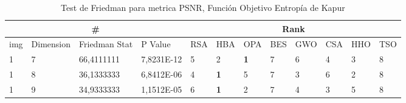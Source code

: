 \documentclass[conference]{IEEEtran}
\begin{document}
\begin{table}[]
	\centering
	\caption{Test de Friedman para metrica PSNR, Función Objetivo Entropía de Kapur}
	\begin{tabular}{|llll|llllllll|}
		\hline
		\multicolumn{4}{|c|}{\#} & \multicolumn{8}{c|}{Rank} \\ \hline
		\multicolumn{1}{|l|}{img} & \multicolumn{1}{l|}{Dimension} & \multicolumn{1}{l|}{Friedman Stat} & P Value & \multicolumn{1}{l|}{RSA} & \multicolumn{1}{l|}{HBA} & \multicolumn{1}{l|}{OPA} & \multicolumn{1}{l|}{BES} & \multicolumn{1}{l|}{GWO} & \multicolumn{1}{l|}{CSA} & \multicolumn{1}{l|}{HHO} & TSO \\ \hline 
\multicolumn{1}{|l|}{1}                                                     & \multicolumn{1}{l|}{7}                                                        & \multicolumn{1}{l|}{66,4111111}                                                   & 7,8231E-12                     & \multicolumn{1}{l|}{5}                                                  & \multicolumn{1}{l|}{2}                                                  & \multicolumn{1}{l|}{\textbf{1}}                                         & \multicolumn{1}{l|}{7}                                                  & \multicolumn{1}{l|}{6}                                                  & \multicolumn{1}{l|}{4}                                                  & \multicolumn{1}{l|}{3}                                                  & 8                          \\ \hline
\multicolumn{1}{|l|}{1}                                                     & \multicolumn{1}{l|}{8}                                                        & \multicolumn{1}{l|}{36,1333333}                                                   & 6,8412E-06                     & \multicolumn{1}{l|}{4}                                                  & \multicolumn{1}{l|}{\textbf{1}}                                         & \multicolumn{1}{l|}{5}                                                  & \multicolumn{1}{l|}{7}                                                  & \multicolumn{1}{l|}{3}                                                  & \multicolumn{1}{l|}{6}                                                  & \multicolumn{1}{l|}{2}                                                  & 8                          \\ \hline
\multicolumn{1}{|l|}{1}                                                     & \multicolumn{1}{l|}{9}                                                        & \multicolumn{1}{l|}{34,9333333}                                                   & 1,1512E-05                     & \multicolumn{1}{l|}{6}                                                  & \multicolumn{1}{l|}{\textbf{1}}                                         & \multicolumn{1}{l|}{2}                                                  & \multicolumn{1}{l|}{7}                                                  & \multicolumn{1}{l|}{4}                                                  & \multicolumn{1}{l|}{3}                                                  & \multicolumn{1}{l|}{5}                                                  & 8                          \\ \hline

\end{tabular}
\end{table}
\end{document}
